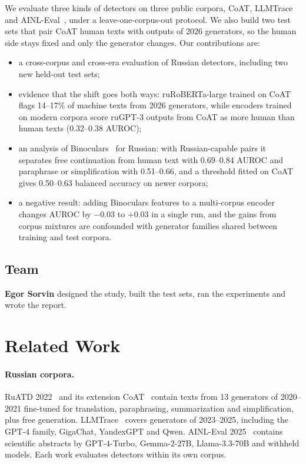 \documentclass{article}
\begin{document}
We evaluate three kinds of detectors on three public corpora, CoAT, LLMTrace~\cite{tolstykh2025llmtrace} and
AINL-Eval~\cite{batura2025ainl}, under a leave-one-corpus-out protocol. We also build two test sets that pair
CoAT human texts with outputs of 2026 generators, so the human side stays fixed and only the generator changes.
Our contributions are:
\begin{itemize}
    \item a cross-corpus and cross-era evaluation of Russian detectors, including two new held-out test sets;
    \item evidence that the shift goes both ways: ruRoBERTa-large trained on CoAT flags 14--17\% of machine
    texts from 2026 generators, while encoders trained on modern corpora score ruGPT-3 outputs from CoAT as more
    human than human texts (0.32--0.38 AUROC);
    \item an analysis of Binoculars~\cite{hans2024binoculars} for Russian: with Russian-capable pairs it separates
    free continuation from human text with 0.69--0.84 AUROC and paraphrase or simplification with 0.51--0.66,
    and a threshold fitted on CoAT gives 0.50--0.63 balanced accuracy on newer corpora;
    \item a negative result: adding Binoculars features to a multi-corpus encoder changes AUROC by $-0.03$ to
    $+0.03$ in a single run, and the gains from corpus mixtures are confounded with generator families shared
    between training and test corpora.
\end{itemize}

\subsection{Team}
\textbf{Egor Sorvin} designed the study, built the test sets, ran the experiments and wrote the report.


\section{Related Work}
\label{sec:related}

\paragraph{Russian corpora.} RuATD 2022~\cite{shamardina2022ruatd} and its extension
CoAT~\cite{shamardina2025coat} contain texts from 13 generators of 2020--2021 fine-tuned for translation,
paraphrasing, summarization and simplification, plus free generation. LLMTrace~\cite{tolstykh2025llmtrace}
covers generators of 2023--2025, including the GPT-4 family, GigaChat, YandexGPT and Qwen.
AINL-Eval 2025~\cite{batura2025ainl} contains scientific abstracts by GPT-4-Turbo, Gemma-2-27B, Llama-3.3-70B and
withheld models. Each work evaluates detectors within its own corpus.
\end{document}
